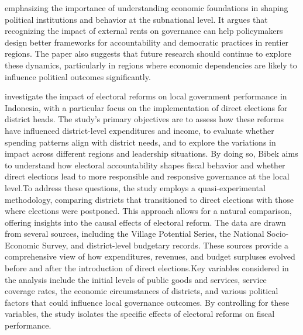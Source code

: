 emphasizing the importance of understanding economic foundations in shaping political institutions and behavior at the subnational level. It argues that recognizing the impact of external rents on governance can help policymakers design better frameworks for accountability and democratic practices in rentier regions. The paper also suggests that future research should continue to explore these dynamics, particularly in regions where economic dependencies are likely to influence political outcomes significantly.  \par
  investigate the impact of electoral reforms on local government performance in Indonesia, with a particular focus on the implementation of direct elections for district heads. The study's primary objectives are to assess how these reforms have influenced district-level expenditures and income, to evaluate whether spending patterns align with district needs, and to explore the variations in impact across different regions and leadership situations. By doing so, Bibek aims to understand how electoral accountability shapes fiscal behavior and whether direct elections lead to more responsible and responsive governance at the local level.To address these questions, the study employs a quasi-experimental methodology, comparing districts that transitioned to direct elections with those where elections were postponed. This approach allows for a natural comparison, offering insights into the causal effects of electoral reform. The data are drawn from several sources, including the Village Potential Series, the National Socio-Economic Survey, and district-level budgetary records. These sources provide a comprehensive view of how expenditures, revenues, and budget surpluses evolved before and after the introduction of direct elections.Key variables considered in the analysis include the initial levels of public goods and services, service coverage rates, the economic circumstances of districts, and various political factors that could influence local governance outcomes. By controlling for these variables, the study isolates the specific effects of electoral reforms on fiscal performance.\par
